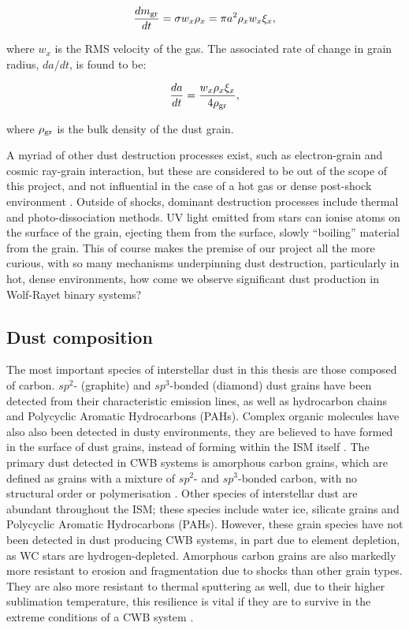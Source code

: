 \begin{equation}
  \frac{dm_\text{gr}}{dt} = \sigma w_{x} \rho_{x} = \pi a^2 \rho_{x} w_{x} \xi_{x} ,
\end{equation}

\noindent
where $w_x$ is the RMS velocity of the gas.
The associated rate of change in grain radius, $da/dt$, is found to be:

\begin{equation}
  \frac{da}{dt} = \frac{w_x \rho_x \xi_x}{4 \rho_\text{gr}},
\end{equation}

\noindent
where $\rho_\text{gr}$ is the bulk density of the dust grain.

A myriad of other dust destruction processes exist, such as electron-grain and cosmic ray-grain interaction, but these are considered to be out of the scope of this project, and not influential in the case of a hot gas or dense post-shock environment
\parencite{jonesDustDestructionProcesses2004}.
Outside of shocks, dominant destruction processes include thermal and photo-dissociation methods.
UV light emitted from stars can ionise atoms on the surface of the grain, ejecting them from the surface, slowly ``boiling'' material from the grain.
This of course makes the premise of our project all the more curious, with so many mechanisms underpinning dust destruction, particularly in hot, dense environments, how come we observe significant dust production in Wolf-Rayet binary systems?

\subsection{Dust composition}

The most important species of interstellar dust in this thesis are those composed of carbon.
$sp^2$- (graphite) and $sp^3$-bonded (diamond) dust grains have been detected from their characteristic emission lines, as well as hydrocarbon chains and Polycyclic Aromatic Hydrocarbons (PAHs).
Complex organic molecules have also also been detected in dusty environments, they are believed to have formed in the surface of dust grains, instead of forming within the ISM itself
\parencite{herbstComplexOrganicInterstellar2009}.
The primary dust detected in CWB systems is amorphous carbon grains, which are defined as grains with a mixture of $sp^2$- and $sp^3$-bonded carbon, with no structural order or polymerisation
\parencite{draine_interstellar_2003}.
Other species of interstellar dust are abundant throughout the ISM; these species include water ice, silicate grains and Polycyclic Aromatic Hydrocarbons (PAHs).
However, these grain species have not been detected in dust producing CWB systems, in part due to element depletion, as WC stars are hydrogen-depleted.
Amorphous carbon grains are also markedly more resistant to erosion and fragmentation due to shocks than other grain types.
They are also more resistant to thermal sputtering as well, due to their higher sublimation temperature, this resilience is vital if they are to survive in the extreme conditions of a CWB system
\parencite{draineDestructionMechanismsInterstellar1979}.

